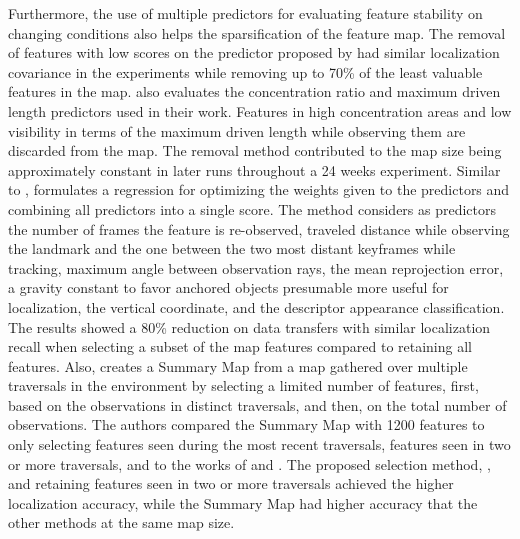 Furthermore, the use of multiple predictors for evaluating feature stability on changing conditions also helps the sparsification of the feature map.
The removal of features with low scores on the predictor proposed by \cite{berrio-et-al:2019:8814289} had similar localization covariance in the experiments while removing up to 70\% of the least valuable features in the map.
\cite{berrio-et-al:2021:3094485} also evaluates the concentration ratio and maximum driven length predictors used in their work. Features in high concentration areas and low visibility in terms of the maximum driven length while observing them are discarded from the map. The removal method contributed to the map size being approximately constant in later runs throughout a 24 weeks experiment.
Similar to \cite{berrio-et-al:2019:8814289}, \cite{dymczyk-et-al:2016:7759673} formulates a regression for optimizing the weights given to the predictors and combining all predictors into a single score. The method considers as predictors the number of frames the feature is re-observed, traveled distance while observing the landmark and the one between the two most distant keyframes while tracking, maximum angle between observation rays, the mean reprojection error, a gravity constant to favor anchored objects presumable more useful for localization, the vertical coordinate, and the descriptor appearance classification. The results showed a 80\% reduction on data transfers with similar localization recall when selecting a subset of the map features compared to retaining all features.
Also, \cite{mühlfellner-et-al:2016:21595} creates a Summary Map from a map gathered over multiple traversals in the environment by selecting a limited number of features, first, based on the observations in distinct traversals, and then, on the total number of observations. The authors compared the Summary Map with 1200 features to only selecting features seen during the most recent traversals, features seen in two or more traversals, and to the works of \cite{konolige-bowman:2009:5354121} and \cite{dayoub-et-al:2011:013}. The proposed selection method, \cite{konolige-bowman:2009:5354121}, and retaining features seen in two or more traversals achieved the higher localization accuracy, while the Summary Map had higher accuracy that the other methods at the same map size.

